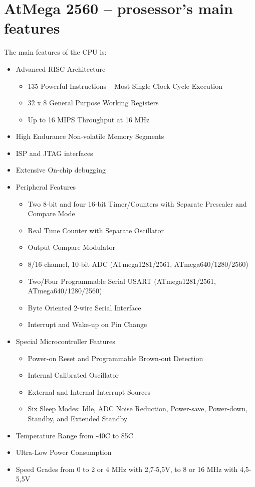 \documentclass[english]{article}
\begin{document}
\section{AtMega 2560 – prosessor’s main features}
The main features of the CPU is:
\begin{itemize}
\item Advanced RISC Architecture
	\begin{itemize}
	\item 135 Powerful Instructions – Most Single Clock Cycle Execution
	\item 32 x 8 General Purpose Working Registers
	\item Up to 16 MIPS Throughput at 16 MHz
	\end{itemize}
\item High Endurance Non-volatile Memory Segments
\item ISP and JTAG interfaces
\item Extensive On-chip debugging 
\item Peripheral Features
	\begin{itemize}
	\item Two 8-bit and four 16-bit Timer/Counters with Separate Prescaler and Compare Mode
	\item Real Time Counter with Separate Oscillator
	\item Output Compare Modulator
	\item 8/16-channel, 10-bit ADC (ATmega1281/2561, ATmega640/1280/2560)
	\item Two/Four Programmable Serial USART (ATmega1281/2561, ATmega640/1280/2560)
	\item Byte Oriented 2-wire Serial Interface
	\item Interrupt and Wake-up on Pin Change
	\end{itemize}
\item Special Microcontroller Features
	\begin{itemize}
	\item Power-on Reset and Programmable Brown-out Detection
	\item Internal Calibrated Oscillator
	\item External and Internal Interrupt Sources
	\item Six Sleep Modes: Idle, ADC Noise Reduction, Power-save, Power-down, Standby,
and Extended Standby
	\end{itemize}
\item Temperature Range from -40\degree C to 85\degree C 
\item Ultra-Low Power Consumption
\item Speed Grades from 0 to 2 or 4 MHz with 2,7-5,5V, to 8 or 16 MHz with 4,5-5,5V
\end{itemize}
\end{document}
